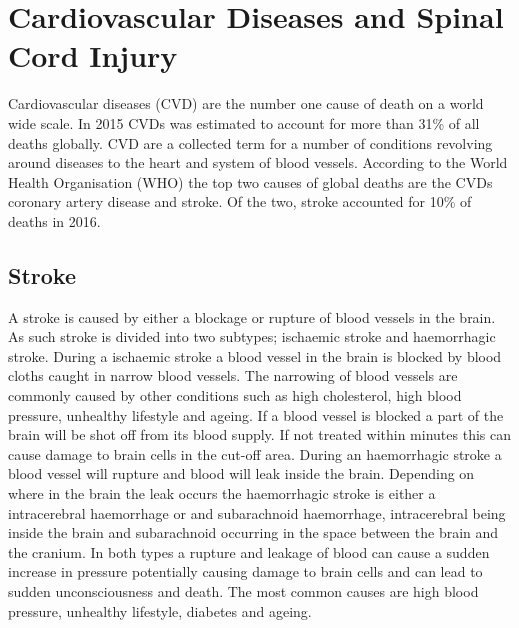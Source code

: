 
\section{Cardiovascular Diseases and Spinal Cord Injury}

Cardiovascular diseases (CVD) are the number one cause of death on a world wide scale. In 2015 CVDs was estimated to account for more than 31\% of all deaths globally. \cite{whocvd2017} CVD are a collected term for a number of conditions revolving around diseases to the heart and system of blood vessels. According to the World Health Organisation (WHO) the top two causes of global deaths are the CVDs coronary artery disease and stroke. Of the two, stroke accounted for 10\% of deaths in 2016. \cite{whoMortalityStats2018}

\subsection{Stroke}
A stroke is caused by either a blockage or rupture of blood vessels in the brain. As such stroke is divided into two subtypes; ischaemic stroke and haemorrhagic stroke. During a ischaemic stroke a blood vessel in the brain is blocked by blood cloths caught in narrow blood vessels. The narrowing of blood vessels are commonly caused by other conditions such as high cholesterol, high blood pressure, unhealthy lifestyle and ageing. If a blood vessel is blocked a part of the brain will be shot off from its blood supply. If not treated within minutes this can cause damage to brain cells in the cut-off area. \cite{Mackay2002, Hering2016chap7, InternetStroke2018} 
During an haemorrhagic stroke a blood vessel will rupture and blood will leak inside the brain. Depending on where in the brain the leak occurs the haemorrhagic stroke is either a intracerebral haemorrhage or and subarachnoid haemorrhage, intracerebral being inside the brain and subarachnoid occurring in the space between the brain and the cranium. In both types a rupture and leakage of blood can cause a sudden increase in pressure potentially causing damage to brain cells and can lead to sudden unconsciousness and death. The most common causes are high blood pressure, unhealthy lifestyle, diabetes and ageing. \cite{Mackay2002, Hering2016chap8, InternetStroke2018}

